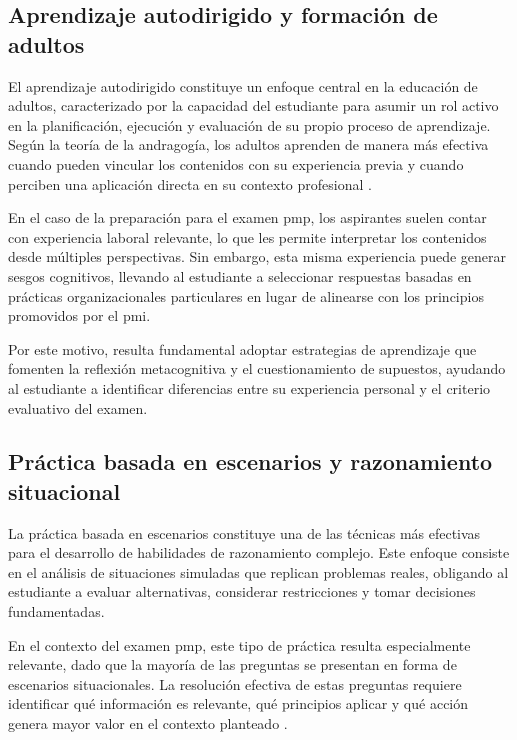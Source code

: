 \subsection{Aprendizaje autodirigido y formación de adultos}

El aprendizaje autodirigido constituye un enfoque central en la educación de adultos, caracterizado por la capacidad del estudiante para asumir un rol activo en la planificación, ejecución y evaluación de su propio proceso de aprendizaje. Según la teoría de la andragogía, los adultos aprenden de manera más efectiva cuando pueden vincular los contenidos con su experiencia previa y cuando perciben una aplicación directa en su contexto profesional \parencite{stclair2024andragogy}.

En el caso de la preparación para el examen \gls{pmp}, los aspirantes suelen contar con experiencia laboral relevante, lo que les permite interpretar los contenidos desde múltiples perspectivas. Sin embargo, esta misma experiencia puede generar sesgos cognitivos, llevando al estudiante a seleccionar respuestas basadas en prácticas organizacionales particulares en lugar de alinearse con los principios promovidos por el \gls{pmi}.

Por este motivo, resulta fundamental adoptar estrategias de aprendizaje que fomenten la reflexión metacognitiva y el cuestionamiento de supuestos, ayudando al estudiante a identificar diferencias entre su experiencia personal y el criterio evaluativo del examen.

\subsection{Práctica basada en escenarios y razonamiento situacional}

La práctica basada en escenarios constituye una de las técnicas más efectivas para el desarrollo de habilidades de razonamiento complejo. Este enfoque consiste en el análisis de situaciones simuladas que replican problemas reales, obligando al estudiante a evaluar alternativas, considerar restricciones y tomar decisiones fundamentadas.

En el contexto del examen \gls{pmp}, este tipo de práctica resulta especialmente relevante, dado que la mayoría de las preguntas se presentan en forma de escenarios situacionales. La resolución efectiva de estas preguntas requiere identificar qué información es relevante, qué principios aplicar y qué acción genera mayor valor en el contexto planteado \parencite{pmi2021handbook}.

